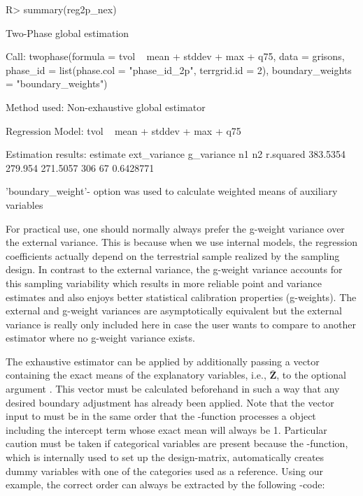 \documentclass[article]{jss}
\begin{document}
\begin{Schunk}
\begin{Sinput}
R> summary(reg2p_nex)
\end{Sinput}
\begin{Soutput}
Two-Phase global estimation
 
Call: 
twophase(formula = tvol ~ mean + stddev + max + q75, data = grisons, 
    phase_id = list(phase.col = "phase_id_2p", terrgrid.id = 2), 
    boundary_weights = "boundary_weights")

Method used:
Non-exhaustive global estimator
 
Regression Model:
tvol ~ mean + stddev + max + q75

Estimation results:
 estimate ext_variance g_variance  n1 n2 r.squared
 383.5354      279.954   271.5057 306 67 0.6428771

'boundary_weight'- option was used to calculate weighted means of auxiliary variables
\end{Soutput}
\end{Schunk}


For practical use, one should normally always prefer the g-weight variance over the external variance. This is because when we use internal models, the regression coefficients actually depend on the terrestrial sample realized by the sampling design. In contrast to the external variance, the g-weight variance accounts for this sampling variability which results in more reliable point and variance estimates and also enjoys better statistical calibration properties (g-weights). The external and g-weight variances are asymptotically equivalent but the external variance is really only included here in case the user wants to compare to another estimator where no g-weight variance exists.

The exhaustive estimator can be applied by additionally passing a vector containing the exact means of the explanatory variables, i.e., $\bar{\pmb{Z}}$, to the optional argument . This vector must be calculated beforehand in such a way that any desired boundary adjustment has already been applied. Note that the vector input to  must be in the same order that the -function processes a  object including the intercept term whose exact mean will always be 1. Particular caution must be taken if categorical variables are present because the -function, which is internally used to set up the design-matrix, automatically creates dummy variables with one of the categories used as a reference. Using our  example, the correct order can always be extracted by the following -code:
\end{document}
